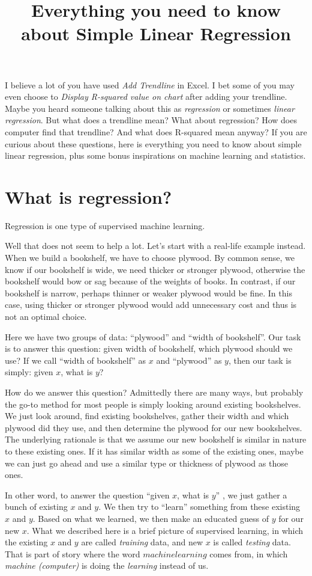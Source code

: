 \documentclass[
	letterpaper
]{article}
\title{Everything you need to know about Simple Linear Regression}
\date{}
\begin{document}
\maketitle
I believe a lot of you have used \textit{Add Trendline} in Excel.
I bet some of you may even choose to \textit{Display R-squared value on chart} after adding your trendline.
Maybe you heard someone talking about this as \textit{regression} or sometimes \textit{linear regression}.
But what does a trendline mean? 
What about regression?
How does computer find that trendline?
And what does R-squared mean anyway?
If you are curious about these questions, here is everything you need to know about simple linear regression, plus some bonus inspirations on machine learning and statistics.
\section{What is regression?}
Regression is one type of supervised machine learning.

Well that does not seem to help a lot.
Let's start with a real-life example instead.
When we build a bookshelf, we have to choose plywood.
By common sense, we know if our bookshelf is wide, we need thicker or stronger plywood, otherwise the bookshelf would bow or sag because of the weights of books.
In contrast, if our bookshelf is narrow, perhaps thinner or weaker plywood would be fine.
In this case, using thicker or stronger plywood would add unnecessary cost and thus is not an optimal choice.

Here we have two groups of data: ``plywood'' and ``width of bookshelf''.
Our task is to answer this question: given width of bookshelf, which plywood should we use?
If we call ``width of bookshelf'' as $x$ and ``plywood'' as $y$, then our task is simply: given $x$, what is $y$?

How do we answer this question? 
Admittedly there are many ways, but probably the go-to method for most people is simply looking around existing bookshelves.
We just look around, find existing bookshelves, gather their width and which plywood did they use, and then determine the plywood for our new bookshelves.
The underlying rationale is that we assume our new bookshelf is similar in nature to these existing ones. 
If it has similar width as some of the existing ones, maybe we can just go ahead and use a similar type or thickness of plywood as those ones.

In other word, to answer the question ``given $x$, what is $y$'' , we just gather a bunch of existing $x$ and $y$.
We then try to ``learn'' something from these existing $x$ and $y$.
Based on what we learned, we then make an educated guess of $y$ for our new $x$.
What we described here is a brief picture of supervised learning, in which the existing $x$ and $y$ are called \textit{training} data, and new $x$ is called \textit{testing} data.
That is part of story where the word $machine learning$ comes from, in which \textit{machine (computer)} is doing the \textit{learning} instead of us.
\end{document}
